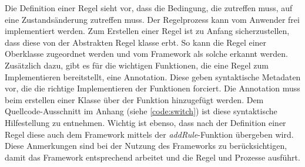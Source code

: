         Die Definition einer Regel sieht vor, dass die Bedingung, die zutreffen muss, auf eine Zustandsänderung zutreffen muss. Der Regelprozess kann vom Anwender 
        frei implementiert werden. Zum Erstellen einer Regel ist zu Anfang sicherzustellen, dass diese von der Abstrakten Regel klasse erbt. So kann die Regel einer 
        Oberklasse zugeordnet werden und vom Framework als solche erkannt werden. Zusätzlich dazu, gibt es für die wichtigen Funktionen, die eine Regel zum 
        Implementieren bereitstellt, eine Annotation. Diese geben syntaktische Metadaten vor, die die richtige Implementieren der Funktionen forciert. Die 
        Annotation muss beim erstellen einer Klasse über der Funktion hinzugefügt werden. Dem Quellcode-Ausschnitt im Anhang (siehe \ref{code:switch}) ist diese 
        syntaktische Hilfestellung zu entnehmen. Wichtig ist ebenso, dass nach der Definition einer Regel diese auch dem Framework mittels der \textit{addRule}-Funktion 
        übergeben wird. 
        \\
        Diese Anmerkungen sind bei der Nutzung des Frameworks zu berücksichtigen, damit das Framework entsprechend arbeitet und die Regel und Prozesse ausführt. 
    
    
